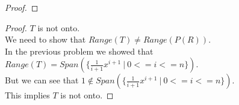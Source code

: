\documentclass[12pt]{article}
\newenvironment{exercise}[2][Exercise]{\begin{trivlist}
\item[\hskip \labelsep{\bfseries #1}\hskip \labelsep{\bfseries #2.}]}{\end{trivlist}}
\begin{document}
\begin{exercise}{2.1.15}
\begin{proof}
    \end{proof}

    \begin{proof} $T$ is not onto. \\

        \noindent We need to show that $Range(T) \neq Range(P(R))$. \\
        In the previous problem we showed that $Range(T) = Span(\{\frac{1}{i+1} x^{i+1}\ |\ 0 <= i <= n\})$. \\
        But we can see that $1 \notin Span(\{\frac{1}{i+1} x^{i+1}\ |\ 0 <= i <= n\})$. \\
        This implies $T$ is not onto.

    \end{proof}

\end{exercise}
\end{document}
